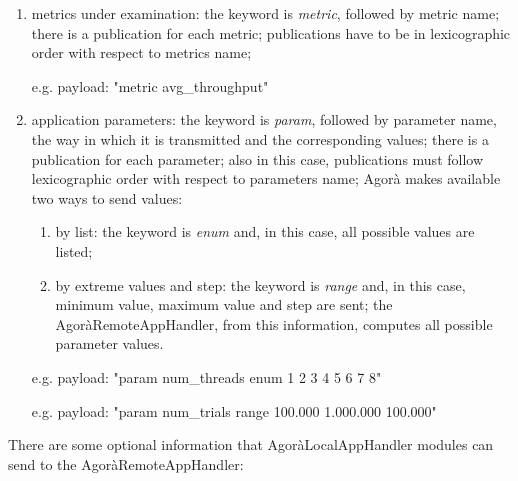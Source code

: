 \begin{enumerate}

    \item metrics under examination: the keyword is \textit{metric}, followed by metric name; there is a publication for each metric; publications have to be in lexicographic order with respect to metrics name;
    
    e.g. payload: "metric avg\_throughput"
    
    \item application parameters: the keyword is \textit{param}, followed by parameter name, the way in which it is transmitted and the corresponding values; there is a publication for each parameter; also in this case, publications must follow lexicographic order with respect to parameters name; Agorà makes available two ways to send values:
    
    \begin{enumerate}
    
        \item by list: the keyword is \textit{enum} and, in this case, all possible values are listed;
        
        \item by extreme values and step: the keyword is \textit{range} and, in this case, minimum value, maximum value and step are sent; the AgoràRemoteAppHandler, from this information, computes all possible parameter values.
    
    \end{enumerate}
    
    e.g. payload: "param num\_threads enum 1 2 3 4 5 6 7 8"
    
    e.g. payload: "param num\_trials range 100.000 1.000.000 100.000"

\end{enumerate}

There are some optional information that AgoràLocalAppHandler modules can send to the AgoràRemoteAppHandler:

